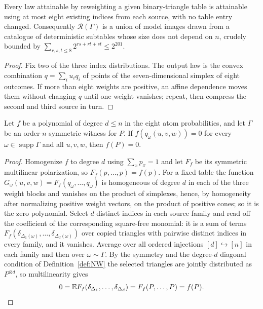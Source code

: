 \begin{proposition}\label{prop:compression}
Every law attainable by reweighting a given binary-triangle table is attainable using at most eight existing indices from each source, with no table entry changed. Consequently $\mathcal R(\Gamma)$ is a union of model images drawn from a catalogue of deterministic subtables whose size does not depend on $n$, crudely bounded by $\sum_{r,s,t\le8}2^{rs+rt+st}\le2^{201}$.
\end{proposition}

\begin{proof}
Fix two of the three index distributions. The output law is the convex combination $q=\sum_iu_iq_i$ of points of the seven-dimensional simplex of eight outcomes. If more than eight weights are positive, an affine dependence moves them without changing $q$ until one weight vanishes; repeat, then compress the second and third source in turn.
\end{proof}

\begin{theorem}\label{thm:identitytransfer}
Let $f$ be a polynomial of degree $d\le n$ in the eight atom probabilities, and let $\Gamma$ be an order-$n$ symmetric witness for $P$. If $f(q_\omega(u,v,w))=0$ for every $\omega\in\operatorname{supp}\Gamma$ and all $u,v,w$, then $f(P)=0$.
\end{theorem}

\begin{proof}
Homogenize $f$ to degree $d$ using $\sum_xp_x=1$ and let $F_f$ be its symmetric multilinear polarization, so $F_f(p,\dots,p)=f(p)$. For a fixed table the function $G_\omega(u,v,w)=F_f(q_\omega,\dots,q_\omega)$ is homogeneous of degree $d$ in each of the three weight blocks and vanishes on the product of simplexes, hence, by homogeneity after normalizing positive weight vectors, on the product of positive cones; so it is the zero polynomial. Select $d$ distinct indices in each source family and read off the coefficient of the corresponding square-free monomial: it is a sum of terms $F_f(\delta_{\Delta_1(\omega)},\dots,\delta_{\Delta_d(\omega)})$ over copied triangles with pairwise distinct indices in every family, and it vanishes. Average over all ordered injections $[d]\hookrightarrow[n]$ in each family and then over $\omega\sim\Gamma$. By the symmetry and the degree-$d$ diagonal condition of Definition~\ref{def:NW} the selected triangles are jointly distributed as $P^{\otimes d}$, so multilinearity gives
\[
0=\mathbb E F_f(\delta_{\Delta_1},\dots,\delta_{\Delta_d})=F_f(P,\dots,P)=f(P). \qedhere
\]
\end{proof}


